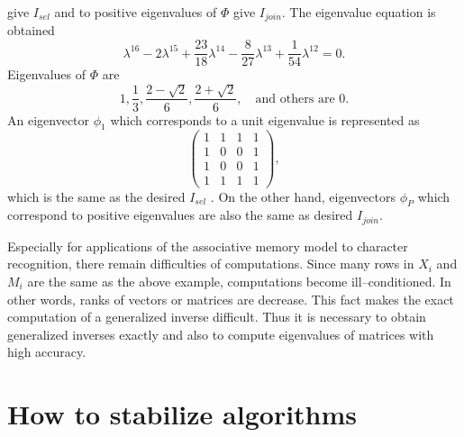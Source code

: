 give $I_{sel} $ and to positive 
eigenvalues of $\Phi $ give $I_{join} $.  
The eigenvalue equation is obtained 
$$ \lambda^{16} - 2 \lambda^{15} 
+ \frac{23}{18} \lambda^{14} - \frac{8}{27} \lambda^{13} 
+ \frac{1}{54} \lambda^{12} = 0 . $$
Eigenvalues of $\Phi $ are 
$$ 1, \frac{1}{3}, \frac{2-\sqrt{2}}{6} , \frac{2+\sqrt{2}}{6}, 
\quad \mbox{and others are } 0 . $$
An eigenvector $\phi_1 $ which corresponds 
to a unit eigenvalue is represented as 
$$  \left( \begin{array}{cccc}
1 & 1 & 1 & 1 \\ 1 & 0 & 0 & 1 \\ 
1 & 0 & 0 & 1 \\ 1 & 1 & 1 & 1
\end{array} \right) , $$
which is the same as the desired $I_{sel} $ .
On the other hand, eigenvectors $\phi_P $ 
which correspond to positive eigenvalues are 
also the same as desired $ I_{join} $. \par
Especially for applications of the associative 
memory model to character recognition, there 
remain difficulties of computations.  
Since many rows in $X_i $ and $M_i $ are the same 
as the above example, computations become 
ill--conditioned.  In other words, ranks of 
vectors or matrices are decrease.  
This fact makes the exact computation of a 
generalized inverse difficult.  
Thus it is necessary to obtain generalized 
inverses exactly and also to compute 
eigenvalues of matrices with high accuracy.

\section{How to stabilize algorithms}

